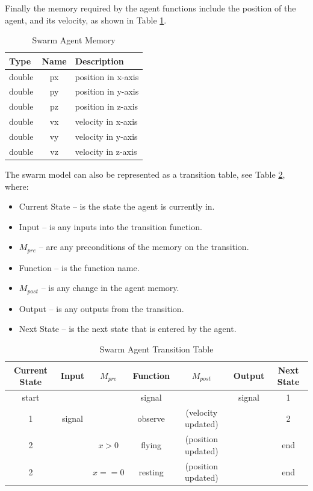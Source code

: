 Finally the memory required by the agent functions include the position of the
agent, and its velocity, as shown in Table \ref{tab:swarm_memory}.

\begin{table}[ht]
\centering
\begin{tabular}{|l||c||l|}
\hline
Type&Name&Description\\
\hline \hline
double&px&position in x-axis\\
\hline
double&py&position in y-axis\\
\hline
double&pz&position in z-axis\\
\hline
double&vx&velocity in x-axis\\
\hline
double&vy&velocity in y-axis\\
\hline
double&vz&velocity in z-axis\\
\hline
\end{tabular}
\caption{Swarm Agent Memory}
\label{tab:swarm_memory}
\end{table}

The swarm model can also be represented as a transition table, see Table
\ref{tab:swarmtransition}, where:

\begin{itemize}
  \item Current State -- is the state the agent is currently in.
  \item Input -- is any inputs into the transition function.
  \item $M_{pre}$ -- are any preconditions of the memory on the transition.
  \item Function -- is the function name.
  \item $M_{post}$ -- is any change in the agent memory.
  \item Output -- is any outputs from the transition.
  \item Next State -- is the next state that is entered by the agent.
\end{itemize}

\begin{table}[ht]
\centering
\begin{tabular}{|c|c|c||c||c|c|c|}
\hline
Current State&Input&$M_{pre}$&Function&$M_{post}$&Output&Next State\\
\hline
\hline
start&&&signal&&signal&1\\
\hline
1&signal&&observe&(velocity updated)&&2\\
\hline
2&&$x > 0$&flying&(position updated)&&end\\
\hline
2&&$x == 0$&resting&(position updated)&&end\\
\hline
\end{tabular}
\caption{Swarm Agent Transition Table}
\label{tab:swarmtransition}
\end{table}

